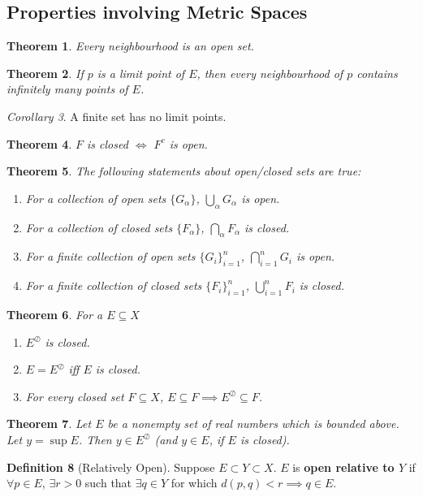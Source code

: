 \documentclass[a4paper,12pt]{report}
\newcommand{\tb}{\textbf}
\theoremstyle{plain}
\newtheorem{theorem}{\color{blue}Theorem}[chapter] %
\theoremstyle{definition}
\newtheorem{definition}[theorem]{\color{red}Definition} %
\theoremstyle{remark}
\newtheorem{corollary}[theorem]{\color{SkyBlue}Corollary} %
\begin{document}
\subsection{Properties involving Metric Spaces}
\begin{theorem}
Every neighbourhood is an open set.
\end{theorem}
\begin{theorem}
If $p$ is a limit point of $E$, then every neighbourhood of $p$ contains infinitely many points of $E$.
\end{theorem}
\begin{corollary}
A finite set has no limit points.
\end{corollary}
\begin{theorem}
$F$ is closed $\iff$ $F^c$ is open.
\end{theorem}
\begin{theorem}
The following statements about open/closed sets are true:
\begin{enumerate}
\item For a collection of open sets $\{G_\alpha\}$, $\bigcup_\alpha G_\alpha$ is open.
\item For a collection of closed sets $\{F_\alpha\}$, $\bigcap_\alpha F_\alpha$ is closed.
\item For a finite collection of open sets $\{G_i\}_{i=1}^n$, $\bigcap_{i=1}^n G_i$ is open.
\item For a finite collection of closed sets $\{F_i\}_{i=1}^n$, $\bigcup_{i=1}^n F_i$ is closed.
\end{enumerate}
\end{theorem}
\begin{theorem}
For a $E\subseteq X$
\begin{enumerate}
\item $E^{\oslash}$ is closed.
\item $E=E^{\oslash}$ \emph{iff} $E$ is closed.
\item For every closed set $F\subseteq X$, $E\subseteq F\implies E^{\oslash}\subseteq F$.
\end{enumerate}
\end{theorem}
\begin{theorem}
Let $E$ be a nonempty set of real numbers which is bounded above. Let $y=\sup  E$. Then $y\in E^{\oslash}$ (and $y\in E$, if $E$ is closed).
\end{theorem}
\begin{definition}[Relatively Open]
Suppose $E\subset Y\subset X$. $E$ is \tb{open relative to $Y$} if $\forall p\in E$, $\exists r>0$ such that $\exists q\in Y$ for which $d(p,q)<r\implies q\in E$.
\end{definition}
\end{document}
